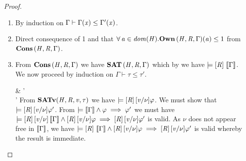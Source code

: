 \begin{proof}
  \leavevmode
  \begin{enumerate}
  \item By induction on $\Gamma  \vdash  \Gamma  (  \mathit{x}  )  \leq  \Gamma'  (  \mathit{x}  )$.
  \item Direct consequence of 1 and that $\forall \,  \mathit{a}  \in \mathit{dom}( \mathit{H} )   .  \mathbf{Own} \, (  \mathit{H}  ,  \mathit{R}  ,  \Gamma  )  (  \mathit{a}  )  \le  1$ from $\mathbf{Cons} \, (  \mathit{H}  ,  \mathit{R}  ,  \Gamma  )$.
  \item From $\mathbf{Cons} \, (  \mathit{H}  ,  \mathit{R}  ,  \Gamma  )$ we have $\mathbf{SAT} \, (  \mathit{H}  ,  \mathit{R}  ,  \Gamma  )$ which by  we have $\models  [  \mathit{R}  ] \,  \left\llbracket{ \Gamma }\right\rrbracket $.
    We now proceed by induction on $\Gamma  \vdash  \tau  \leq  \tau'$.
    \begin{eqncase}{
        \tau  \ottsym{=}   \set{  \nu  \COL \TINT \mid  \varphi }  & \tau'  \ottsym{=}     \\
        \models   \sem{ \Gamma }   \wedge  \varphi  \implies  \varphi'
      }
      From $ \mathbf{SATv} ( \mathit{H} , \mathit{R} , \mathit{v} , \tau ) $ we have $\models  [  \mathit{R}  ] \, [  \mathit{v}  /  \nu  ]  \varphi$.
      We must show that $\models  [  \mathit{R}  ] \, [  \mathit{v}  /  \nu  ]  \varphi'$.
      From $\models   \left\llbracket{ \Gamma }\right\rrbracket   \wedge  \varphi  \implies  \varphi'$ we must have
      $\models  [  \mathit{R}  ] \, [  \mathit{v}  /  \nu  ]   \left\llbracket{ \Gamma }\right\rrbracket   \wedge  [  \mathit{R}  ] \, [  \mathit{v}  /  \nu  ]  \varphi  \implies  [  \mathit{R}  ] \, [  \mathit{v}  /  \nu  ]  \varphi'$ is valid.
      As $\nu$ does not appear free in $ \left\llbracket{ \Gamma }\right\rrbracket $, we have
      $\models  [  \mathit{R}  ] \,  \left\llbracket{ \Gamma }\right\rrbracket   \wedge  [  \mathit{R}  ] \, [  \mathit{v}  /  \nu  ]  \varphi  \implies  [  \mathit{R}  ] \, [  \mathit{v}  /  \nu  ]  \varphi'$ is
      valid whereby the result is immediate.
    \end{eqncase}
    

\end{enumerate}
\end{proof}
